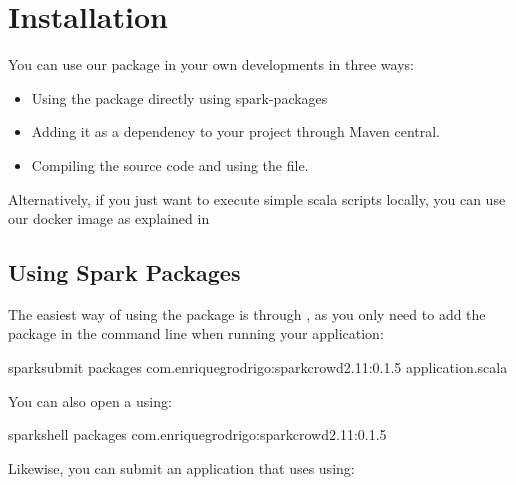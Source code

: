 \documentclass[letterpaper,10pt,english]{sphinxmanual}
\begin{document}
\chapter{Installation}
\label{\detokenize{usage/installation:installation}}\label{\detokenize{usage/installation:id1}}\label{\detokenize{usage/installation::doc}}
You can use our package in your own developments in three ways:
\begin{itemize}
\item {} 
Using the package directly using spark-packages

\item {} 
Adding it as a dependency to your project through Maven central.

\item {} 
Compiling the source code and using the  file.

\end{itemize}

Alternatively, if you just want to execute simple scala scripts locally,
you can use our docker image as explained in {\hyperref[\detokenize{usage/quickstart:quickstart}]{}}


\section{Using Spark Packages}
\label{\detokenize{usage/installation:using-spark-packages}}
The easiest way of using the package is through , as you only need to add the package in the command line when running your
application:

%
\begin{sphinxVerbatim}[commandchars=\\\{\}]
spark\PYGZhy{}submit \PYGZhy{}\PYGZhy{}packages com.enriquegrodrigo:spark\PYGZhy{}crowd\PYGZus{}2.11:0.1.5 application.scala
\end{sphinxVerbatim}

You can also open a  using:

%
\begin{sphinxVerbatim}[commandchars=\\\{\}]
spark\PYGZhy{}shell \PYGZhy{}\PYGZhy{}packages com.enriquegrodrigo:spark\PYGZhy{}crowd\PYGZus{}2.11:0.1.5
\end{sphinxVerbatim}

Likewise, you can submit an application that uses  using:
\end{document}
